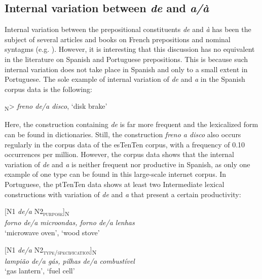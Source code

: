 \documentclass[output=paper]{langsci/langscibook}
\begin{document}
\subsection{Internal variation between \textit{de} and \textit{a/à}}

Internal variation between the prepositional constituents \textit{de} and \textit{à} has been the subject of several articles and books on French prepositions and nominal syntagms (e.g. \citealt{Anscombre:1990, Lang:1991, Bosredon:1991, Cadiot:1997}). However, it is interesting that this discussion has no equivalent in the literature on Spanish and Portuguese prepositions. This is because such internal variation does not take place in Spanish and only to a small extent in Portuguese. The sole example of internal variation of \textit{de} and \textit{a} in the Spanish corpus data is the following:

\ea{}\textsubscript{N}>		\textit{freno de/a disco},	`disk brake'\z

Here, the construction containing \textit{de} is far more frequent and the lexicalized form can be found in dictionaries. Still, the construction \textit{freno a disco} also occurs regularly in the corpus data of the esTenTen corpus, with a frequency of 0.10 occurrences per million. However, the corpus data shows that the internal variation of \textit{de} and \textit{a} is neither frequent nor productive in Spanish, as only one example of one type can be found in this large-scale internet corpus. In Portuguese, the ptTenTen data shows at least two Intermediate lexical constructions with variation of \textit{de} and \textit{a} that present a certain productivity:

\begin{exe}\ex\begin{minipage}[t]{0.4\textwidth}    %
[N1 \textit{de/a} N2\textsubscript{\scshape purpose}]\textsubscript{N}\\
\textit{forno de/a microondas,  forno de/a lenhas}\\
`microwave oven',         `wood stove'
\end{minipage}\hfill    %
\begin{minipage}[t]{0.45\textwidth}
[N1 \textit{de/a} N2\textsubscript{\scshape type/specification}]\textsubscript{N}\\
\textit{lampião de/a gás,   pilhas de/a combustível }\\
`gas lantern',           `fuel cell'
\end{minipage}%
\end{exe}
\end{document}
